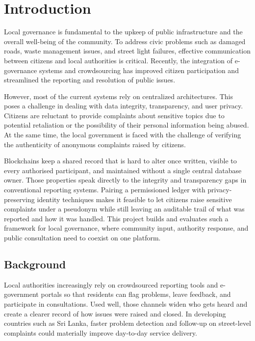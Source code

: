 \chapter{Introduction}
\label{ch:introduction}

Local governance is fundamental to the upkeep of public infrastructure and the overall well-being of the community. To address civic problems such as damaged roads, waste management issues, and street light failures, effective communication between citizens and local authorities is critical. Recently, the integration of e-governance systems and crowdsourcing has improved citizen participation and streamlined the reporting and resolution of public issues.

However, most of the current systems rely on centralized architectures. This poses a challenge in dealing with data integrity, transparency, and user privacy. Citizens are reluctant to provide complaints about sensitive topics due to potential retaliation or the possibility of their personal information being abused. At the same time, the local government is faced with the challenge of verifying the authenticity of anonymous complaints raised by citizens.

Blockchains keep a shared record that is hard to alter once written, visible to every authorised participant, and maintained without a single central database owner. Those properties speak directly to the integrity and transparency gaps in conventional reporting systems. Pairing a permissioned ledger with privacy-preserving identity techniques makes it feasible to let citizens raise sensitive complaints under a pseudonym while still leaving an auditable trail of what was reported and how it was handled. This project builds and evaluates such a framework for local governance, where community input, authority response, and public consultation need to coexist on one platform.

\section{Background}

Local authorities increasingly rely on crowdsourced reporting tools and e-government portals so that residents can flag problems, leave feedback, and participate in consultations. Used well, those channels widen who gets heard and create a clearer record of how issues were raised and closed. In developing countries such as Sri Lanka, faster problem detection and follow-up on street-level complaints could materially improve day-to-day service delivery.

